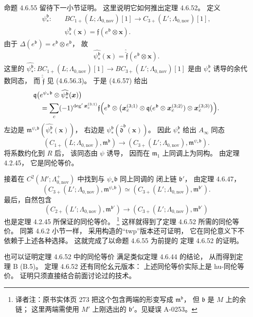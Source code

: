 命题 4.6.55 留待下一小节证明。
这里说明它如何推出定理 4.6.52。
定义
\[
\begin{aligned}
\psi_*^{\mathfrak b}\colon\quad
&BC_{1+}(L;\Lambda_{0,\mathrm{nov}})[1]
\longrightarrow C_{3+}(L';\Lambda_{0,\mathrm{nov}})[1],\\
&\psi_*^{\mathfrak b}(\boldsymbol x)
=\mathfrak f(e^{\mathfrak b}\otimes\boldsymbol x).
\end{aligned}
\]
由于
$\Delta(e^{\mathfrak b})
=e^{\mathfrak b}\otimes e^{\mathfrak b}$，
故
\[
\widehat{\psi_*^{\mathfrak b}}(\boldsymbol x)
=\widehat{\widehat{\mathfrak f}}
 (e^{\mathfrak b}\otimes\boldsymbol x).
\]
这里的
$\widehat{\psi_*^{\mathfrak b}}\colon
BC_{1+}(L;\Lambda_{0,\mathrm{nov}})[1]
\to BC_{3+}(L';\Lambda_{0,\mathrm{nov}})[1]$
是由 $\psi_*^{\mathfrak b}$ 诱导的余代数同态，
而 $\widehat{\widehat{\mathfrak f}}$
见 (4.6.56.3)。
于是 (4.6.57) 给出
\[
\begin{aligned}
&\mathfrak q\bigl(
 e^{\psi_*\mathfrak b}
 \otimes\widehat{\psi_*^{\mathfrak b}}(\boldsymbol x)
 \bigr)\\
&\quad=
\sum_c(-1)^{\deg'\boldsymbol x_c^{(3;1)}}
\mathfrak f\Bigl(
 e^{\mathfrak b}\otimes
 \bigl(\boldsymbol x_c^{(3;1)}
 \otimes\mathfrak q(
  e^{\mathfrak b}\otimes\boldsymbol x_c^{(3;2)})
 \otimes\boldsymbol x_c^{(3;3)}\bigr)\Bigr).
\end{aligned}
\]
左边是
$\mathfrak m^{\psi_*\mathfrak b}
 (\widehat{\psi_*^{\mathfrak b}}(\boldsymbol x))$，
右边是
$\psi_*^{\mathfrak b}
 (\widehat{\mathfrak d}^{\mathfrak b}(\boldsymbol x))$。
因此 $\psi_*^{\mathfrak b}$ 给出 $A_\infty$ 同态
\[
(C_{1+}(L;\Lambda_{0,\mathrm{nov}}),
 \mathfrak m^{\mathfrak b})
\longrightarrow
(C_{3+}(L';\Lambda_{0,\mathrm{nov}}),
 \mathfrak m^{\psi_*\mathfrak b}).
\]
将系数约化到 $R$ 后，
该同态由 $\psi$ 诱导，
因而在 $\mathfrak m_1$ 上同调上为同构。
由定理 4.2.45，
它是同伦等价。

接着在 $C^2(M';\Lambda^+_{0,\mathrm{nov}})$
中找到与 $\psi_*\mathfrak b$ 同上同调的
闭上链 $\mathfrak b'$，
由定理 4.6.47，
\[
(C_{3+}(L';\Lambda_{0,\mathrm{nov}}),
  \mathfrak m^{\psi_*\mathfrak b})
\simeq
(C_{3+}(L';\Lambda_{0,\mathrm{nov}}),
  \mathfrak m^{\mathfrak b'}).
\]
最后，自然包含
\[
(C_{2+}(L';\Lambda_{0,\mathrm{nov}}),
  \mathfrak m^{\mathfrak b'})
\longrightarrow
(C_{3+}(L';\Lambda_{0,\mathrm{nov}}),
  \mathfrak m^{\mathfrak b'})
\]
也是定理 4.2.45 所保证的同伦等价。
\footnote{译者注：原书实体页 273
把这个包含两端的形变写成
$\mathfrak m^{\mathfrak b}$，
但 $\mathfrak b$ 是 $M$ 上的余链；
这里两端需使用 $M'$ 上刚选出的
$\mathfrak b'$。见疑误 A-0253。}
这样就得到了定理 4.6.52 所需的同伦等价。
同第 4.6.2 小节一样，
采用构造的“twp”版本还可证明，
它在同伦意义下不依赖于上述各种选择。
这就完成了以命题 4.6.55 为前提的
定理 4.6.52 的证明。

也可以证明定理 4.6.52 中的同伦等价
满足类似定理 4.6.44 的结论，
从而得到定理 B (B.5)。
定理 4.6.52 还有同伦幺元版本：
上述同伦等价实际上是 hu-同伦等价。
证明只须直接结合前面讨论过的技术。
